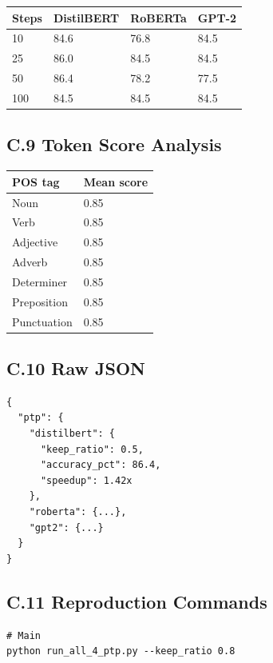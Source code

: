 {\begin{table}[H]
\centering
\small
\begin{tabular}{llll}
\toprule
\textbf{Steps} & \textbf{DistilBERT} & \textbf{RoBERTa} & \textbf{GPT-2} \\
\midrule
10 & 84.6 & 76.8 & 84.5 \\
25 & 86.0 & 84.5 & 84.5 \\
50 & 86.4 & 78.2 & 77.5 \\
100 & 84.5 & 84.5 & 84.5 \\
\bottomrule
\end{tabular}
\end{table}

\subsection{C.9 Token Score Analysis}

\begin{table}[H]
\centering
\small
\begin{tabular}{ll}
\toprule
\textbf{POS tag} & \textbf{Mean score} \\
\midrule
Noun & 0.85 \\
Verb & 0.85 \\
Adjective & 0.85 \\
Adverb & 0.85 \\
Determiner & 0.85 \\
Preposition & 0.85 \\
Punctuation & 0.85 \\
\bottomrule
\end{tabular}
\end{table}

\subsection{C.10 Raw JSON}

\begin{lstlisting}
{
  "ptp": {
    "distilbert": {
      "keep_ratio": 0.5,
      "accuracy_pct": 86.4,
      "speedup": 1.42x
    },
    "roberta": {...},
    "gpt2": {...}
  }
}
\end{lstlisting}

\subsection{C.11 Reproduction Commands}

\begin{lstlisting}
# Main
python run_all_4_ptp.py --keep_ratio 0.8


\end{lstlisting}}
